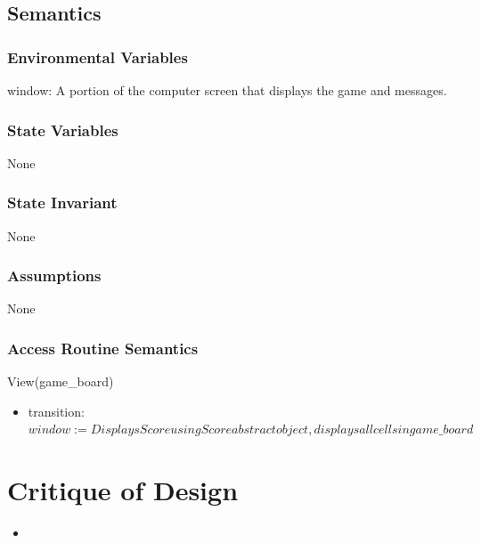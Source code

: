 \documentclass[12pt]{article}
\begin{document}
\subsection* {Semantics}

\subsubsection* {Environmental Variables}

window: A portion of the computer screen that displays the game and messages. 

\subsubsection* {State Variables}

None

\subsubsection* {State Invariant}

None

\subsubsection* {Assumptions}

None

\subsubsection* {Access Routine Semantics}

\noindent View(game\_board)

\begin{itemize}
\item transition: $\mathit{window} := \mathit{Displays Score using Score abstract object, displays all cells in game\_board}$

\end{itemize}

\newpage

\section* {Critique of Design}

\begin{itemize}

\item 

\end{itemize}
\end{document}
